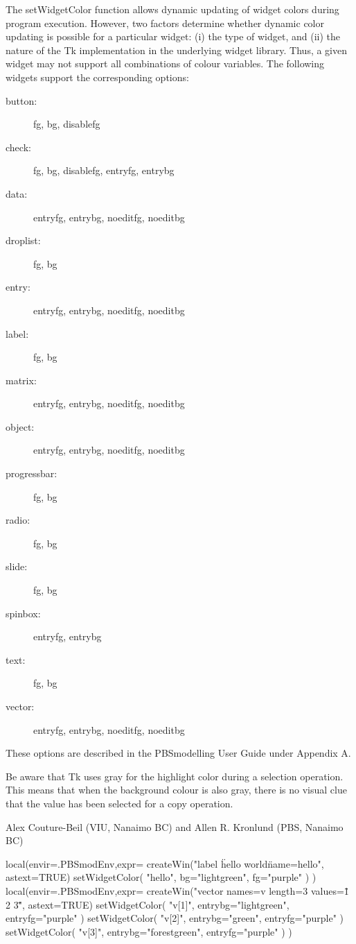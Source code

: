 \documentclass[letterpaper]{book}
\begin{document}
\begin{Details}\relax
The setWidgetColor function allows dynamic updating of widget colors during program execution.
However, two factors determine whether dynamic color updating is possible for a particular
widget: (i) the type of widget, and (ii) the nature of the Tk implementation in the underlying
widget library.  Thus, a given widget may not support all combinations of colour variables. 
The following widgets support the corresponding options:

\begin{description}

\item[button:] fg, bg, disablefg
\item[check:] fg, bg, disablefg, entryfg, entrybg
\item[data:] entryfg, entrybg, noeditfg, noeditbg
\item[droplist:] fg, bg
\item[entry:] entryfg, entrybg, noeditfg, noeditbg
\item[label:] fg, bg
\item[matrix:] entryfg, entrybg, noeditfg, noeditbg
\item[object:] entryfg, entrybg, noeditfg, noeditbg
\item[progressbar:] fg, bg
\item[radio:] fg, bg
\item[slide:] fg, bg
\item[spinbox:] entryfg, entrybg
\item[text:] fg, bg
\item[vector:] entryfg, entrybg, noeditfg, noeditbg

\end{description}


These options are described in the PBSmodelling User Guide under Appendix A.

Be aware that Tk uses gray for the highlight color during a selection operation.
This means that when the background colour is also gray, there is no visual clue
that the value has been selected for a copy operation.

\end{Details}
%
\begin{Author}\relax
Alex Couture-Beil (VIU, Nanaimo BC) and Allen R. Kronlund (PBS, Nanaimo BC)
\end{Author}
%
\begin{Examples}
\begin{ExampleCode}
local(envir=.PBSmodEnv,expr={
  createWin("label \"hello world\" name=hello", astext=TRUE)
  setWidgetColor( "hello", bg="lightgreen", fg="purple" )
})
local(envir=.PBSmodEnv,expr={
  createWin("vector names=v length=3 values=\"1 2 3\"", astext=TRUE)
  setWidgetColor( "v[1]", entrybg="lightgreen", entryfg="purple" )
  setWidgetColor( "v[2]", entrybg="green", entryfg="purple" )
  setWidgetColor( "v[3]", entrybg="forestgreen", entryfg="purple" )
})
\end{ExampleCode}
\end{Examples}
\end{document}
